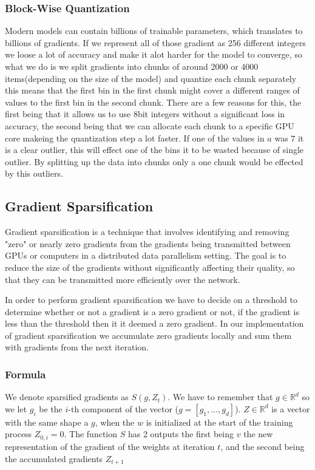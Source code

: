\documentclass[11pt]{article}
\begin{document}
\subsubsection{Block-Wise Quantization}

Modern models can contain billions of trainable parameters, which translates to billions of gradients. If we represent all of those gradient as 256 different integers we loose a lot of accuracy and make it alot harder for the model to converge, so what we do is we split gradients into chunks of around 2000 or 4000 items(depending on the size of the model) and quantize each chunk separately this means that the first bin in the first chunk might cover a different ranges of values to the first bin in the second chunk. There are a few reasons for this, the first being that it allows us to use 8bit integers without a significant loss in accuracy, the second being that we can allocate each chunk to a specific GPU core makeing the quantization step a lot faster. If one of the values in $a$ was $7$ it is a clear outlier, this will effect one of the bins it to be wasted because of single outlier. By splitting up the data into chunks only a one chunk would be effected by this outliers.


\subsection{Gradient Sparsification}
Gradient sparsification is a technique that involves identifying and removing "zero" or nearly zero gradients \cite{NEURIPS2018_3328bdf9} from the gradients being transmitted between GPUs or computers in a distributed data parallelism setting. The goal is to reduce the size of the gradients without significantly affecting their quality, so that they can be transmitted more efficiently over the network.

In order to perform gradient sparsification we have to decide on a threshold to determine whether or not a gradient is a zero gradient or not, if the gradient is less than the threshold then it it deemed a zero gradient. In our implementation of gradient sparsification we accumulate zero gradients locally and sum them with gradients from the next iteration. 

\subsubsection{Formula}
We denote sparsified gradients as $S(g, Z_t)$. We have to remember that $g \in \mathbb{R}^d$ so we let $g_i$ be the $i$-th component of the vector ($g=[g_1,\ldots,g_d]$). $Z \in \mathbb{R}^d$ is a vector with the same shape a $g$, when the $w$ is initialized at the start of the training process $Z_{0,i} = 0$. The function $S$ has 2 outputs the first being $v$ the new representation of the gradient of the weights at iteration $t$, and the second being the accumulated gradients $Z_{t+1}$
\end{document}

